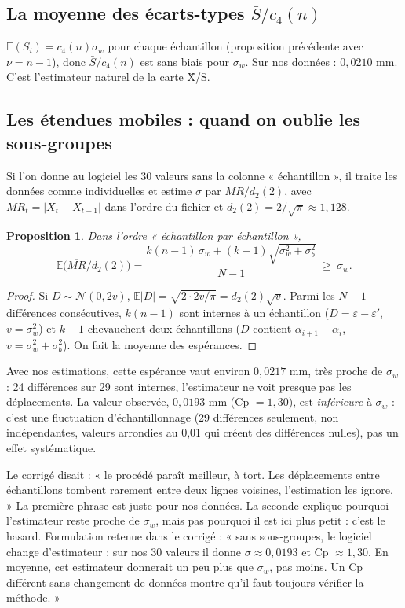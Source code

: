 \documentclass[11pt,a4paper]{article}
\theoremstyle{tq}
\newtheorem{prop}{Proposition}
\theoremstyle{remark}
\newcommand{\E}{\mathbb{E}}
\newcommand{\sw}{\sigma_w}
\newcommand{\sbt}{\sigma_b}
\begin{document}
\subsection{La moyenne des écarts-types $\bar S/c_4(n)$}

$\E(S_i) = c_4(n)\sw$ pour chaque échantillon (proposition précédente avec $\nu=n-1$), donc $\bar S/c_4(n)$ est sans biais pour $\sw$. Sur nos données : $0{,}0210$ mm. C'est l'estimateur naturel de la carte X̄/S.

\subsection{Les étendues mobiles : quand on oublie les sous-groupes}

Si l'on donne au logiciel les 30 valeurs sans la colonne « échantillon », il traite les données comme individuelles et estime $\sigma$ par $\overline{MR}/d_2(2)$, avec $MR_t = |X_t-X_{t-1}|$ dans l'ordre du fichier et $d_2(2) = 2/\sqrt\pi \approx 1{,}128$.

\begin{prop}
Dans l'ordre « échantillon par échantillon »,
\[\E\big(\overline{MR}/d_2(2)\big) = \frac{k(n-1)\,\sw + (k-1)\sqrt{\sw^2+\sbt^2}}{N-1}\ \geq\ \sw .\]
\end{prop}
\begin{proof}
Si $D\sim\mathcal N(0,2v)$, $\E|D| = \sqrt{2\cdot 2v/\pi} = d_2(2)\sqrt v$. Parmi les $N-1$ différences consécutives, $k(n-1)$ sont internes à un échantillon ($D=\varepsilon-\varepsilon'$, $v=\sw^2$) et $k-1$ chevauchent deux échantillons ($D$ contient $\alpha_{i+1}-\alpha_i$, $v=\sw^2+\sbt^2$). On fait la moyenne des espérances.
\end{proof}

Avec nos estimations, cette espérance vaut environ $0{,}0217$ mm, très proche de $\sw$ : 24 différences sur 29 sont internes, l'estimateur ne voit presque pas les déplacements. La valeur observée, $0{,}0193$ mm (Cp $=1{,}30$), est \emph{inférieure} à $\sw$ : c'est une fluctuation d'échantillonnage (29 différences seulement, non indépendantes, valeurs arrondies au 0,01 qui créent des différences nulles), pas un effet systématique.

\begin{alerte}
Le corrigé disait : « le procédé paraît meilleur, à tort. Les déplacements entre échantillons tombent rarement entre deux lignes voisines, l'estimation les ignore. » La première phrase est juste pour nos données. La seconde explique pourquoi l'estimateur reste proche de $\sw$, mais pas pourquoi il est ici plus petit : c'est le hasard. Formulation retenue dans le corrigé : « sans sous-groupes, le logiciel change d'estimateur ; sur nos 30 valeurs il donne $\sigma \approx 0{,}0193$ et Cp $\approx 1{,}30$. En moyenne, cet estimateur donnerait un peu plus que $\sw$, pas moins. Un Cp différent sans changement de données montre qu'il faut toujours vérifier la méthode. »
\end{alerte}
\end{document}
